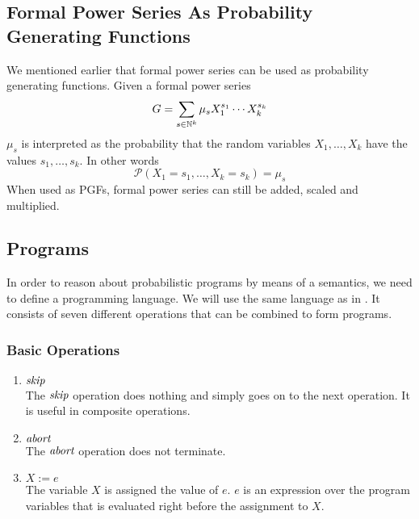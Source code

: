 \subsection{Formal Power Series As Probability Generating Functions}
We mentioned earlier that formal power series can be used as probability generating functions.
Given a formal power series
\[ G = \sum\limits_{s \in \mathbb{N}^k} \mu_s X_1^{s_1} \cdots X_k^{s_k} \]
$\mu_s$ is interpreted as the probability that the random variables $X_1, \ldots, X_k$ have the values $s_1, \ldots, s_k$. In other words
\[ \mathcal{P}(X_1 = s_1, \ldots, X_k = s_k) = \mu_s \]
When used as PGFs, formal power series can still be added, scaled and multiplied.

\subsection{Programs}
In order to reason about probabilistic programs by means of a semantics, we need to define a programming language.
We will use the same language as in \cite{clara:pgf}.
It consists of seven different operations that can be combined to form programs.

\subsubsection*{Basic Operations}
\begin{enumerate}
	\item $\textit{skip}$ \vspace{0.3\baselineskip} \\
		The $\textit{skip}$ operation does nothing and simply goes on to the next operation.
		It is useful in composite operations.
	\item $\textit{abort}$ \vspace{0.3\baselineskip} \\
		The $\textit{abort}$ operation does not terminate.
	\item ${X := e}$ \vspace{0.3\baselineskip} \\
		The variable $X$ is assigned the value of $e$.
		$e$ is an expression over the program variables that is evaluated right before the assignment to $X$.
\end{enumerate}
